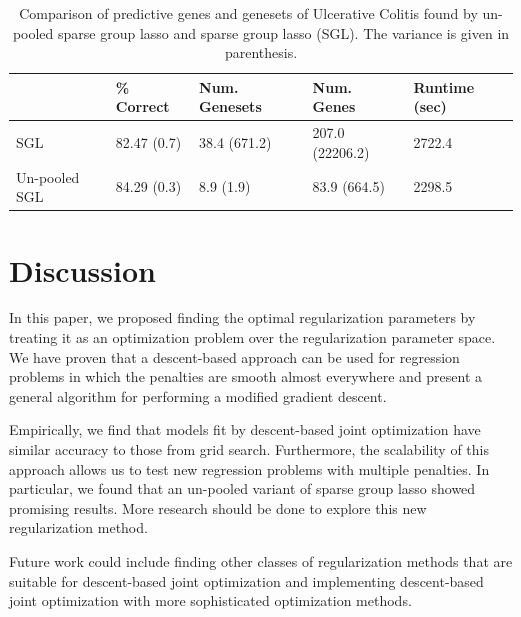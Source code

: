 \documentclass[12pt,letterpaper]{article}
\begin{document}
\begin{table}
\begin{center}
\begin{tabular}{| l | l | l | l | l | }
\hline
 & \% Correct  & Num. Genesets & Num. Genes & Runtime (sec) \\
\hline
SGL & 82.47 (0.7) & 38.4 (671.2) & 207.0 (22206.2) & 2722.4 \\
\hline
Un-pooled SGL & 84.29 (0.3) & 8.9 (1.9) & 83.9 (664.5) & 2298.5 \\
\hline
\end{tabular}
\end{center}
\caption {Comparison of predictive genes and genesets of Ulcerative Colitis found by un-pooled sparse group lasso and sparse group lasso (SGL). The variance is given in parenthesis.}
\label{colitis}
\end{table}

\section{Discussion}
In this paper, we proposed finding the optimal regularization parameters by treating it as an optimization problem over the regularization parameter space. We have proven that a descent-based approach can be used for regression problems in which the penalties are smooth almost everywhere and present a general algorithm for performing a modified gradient descent.

Empirically, we find that models fit by descent-based joint optimization have similar accuracy to those from grid search. Furthermore, the scalability of this approach allows us to test new regression problems with multiple penalties. In particular, we found that an un-pooled variant of sparse group lasso showed promising results. More research should be done to explore this new regularization method.

Future work could include finding other classes of regularization methods that are suitable for descent-based joint optimization and implementing descent-based joint optimization with more sophisticated optimization methods.

\bigskip



\end{document}
